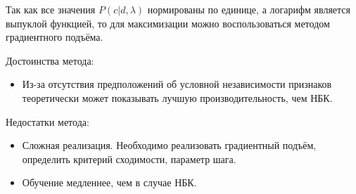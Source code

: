 Так как все значения $P(c|d, \lambda)$ нормированы по единице, а логарифм является выпуклой функцией, то для максимизации можно воспользоваться
методом градиентного подъёма.

Достоинства метода:
\begin{itemize}

\item
Из-за отсутствия предположений об условной независимости признаков
теоретически может показывать лучшую производительность, чем
НБК.

\end{itemize}

Недостатки метода:
\begin{itemize}

\item
Сложная реализация. Необходимо реализовать градиентный подъём,
определить критерий сходимости, параметр шага.

\item
Обучение медленнее, чем в случае НБК.

\end{itemize}